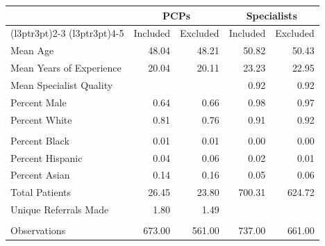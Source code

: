 
\begin{tabular}{lrrrr}
\toprule
\multicolumn{1}{c}{ } & \multicolumn{2}{c}{PCPs} & \multicolumn{2}{c}{Specialists} \\
\cmidrule(l{3pt}r{3pt}){2-3} \cmidrule(l{3pt}r{3pt}){4-5}
  & Included & Excluded & Included & Excluded\\
\midrule
Mean Age & 48.04 & 48.21 & 50.82 & 50.43\\
Mean Years of Experience & 20.04 & 20.11 & 23.23 & 22.95\\
Mean Specialist Quality &  &  & 0.92 & 0.92\\
Percent Male & 0.64 & 0.66 & 0.98 & 0.97\\
Percent White & 0.81 & 0.76 & 0.91 & 0.92\\
\addlinespace\\
Percent Black & 0.01 & 0.01 & 0.00 & 0.00\\
Percent Hispanic & 0.04 & 0.06 & 0.02 & 0.01\\
Percent Asian & 0.14 & 0.16 & 0.05 & 0.06\\
Total Patients & 26.45 & 23.80 & 700.31 & 624.72\\
Unique Referrals Made & 1.80 & 1.49 &  & \\
\addlinespace\\
Observations & 673.00 & 561.00 & 737.00 & 661.00\\
\bottomrule
\end{tabular}
